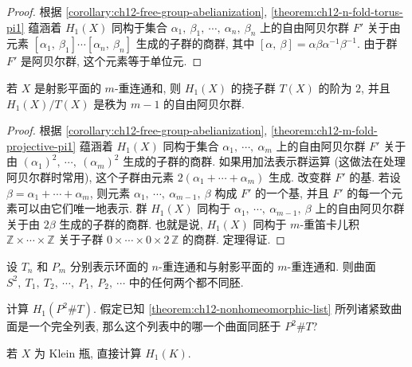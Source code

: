 \begin{proof}
根据 \cref{corollary:ch12-free-group-abelianization}, \cref{theorem:ch12-n-fold-torus-pi1} 蕴涵着 $H_{1}(X)$ 同构于集合 $\alpha_{1},\ \beta_{1},\ \cdots,\ \alpha_{n},\ \beta_{n}$ 上的自由阿贝尔群 $F'$ 关于由元素 $[\alpha_{1},\ \beta_{1}]\cdots[\alpha_{n},\ \beta_{n}]$ 生成的子群的商群, 其中 $[\alpha,\ \beta]=\alpha\beta\alpha^{-1}\beta^{-1}$. 由于群 $F'$ 是阿贝尔群, 这个元素等于单位元.
\end{proof}

\begin{theorem}
\label{theorem:ch12-projective-sum-homology}
若 $X$ 是射影平面的 $m$-重连通和, 则 $H_{1}(X)$ 的挠子群 $T(X)$ 的阶为 $2$, 并且 $H_{1}(X)/T(X)$ 是秩为 $m-1$ 的自由阿贝尔群.
\end{theorem}

\begin{proof}
根据 \cref{corollary:ch12-free-group-abelianization}, \cref{theorem:ch12-m-fold-projective-pi1} 蕴涵着 $H_{1}(X)$ 同构于集合 $\alpha_{1},\ \cdots,\ \alpha_{m}$ 上的自由阿贝尔群 $F'$ 关于由 $(\alpha_{1})^{2},\ \cdots,\ (\alpha_{m})^{2}$ 生成的子群的商群. 如果用加法表示群运算 (这做法在处理阿贝尔群时常用), 这个子群由元素 $2(\alpha_{1}+\cdots+\alpha_{m})$ 生成. 改变群 $F'$ 的基. 若设 $\beta=\alpha_{1}+\cdots+\alpha_{m}$, 则元素 $\alpha_{1},\ \cdots,\ \alpha_{m-1},\ \beta$ 构成 $F'$ 的一个基, 并且 $F'$ 的每一个元素可以由它们唯一地表示. 群 $H_{1}(X)$ 同构于 $\alpha_{1},\ \cdots,\ \alpha_{m-1},\ \beta$ 上的自由阿贝尔群关于由 $2\beta$ 生成的子群的商群. 也就是说, $H_{1}(X)$ 同构于 $m$-重笛卡儿积 $\mathbb{Z}\times\cdots\times\mathbb{Z}$ 关于子群 $0\times\cdots\times 0\times 2\,\mathbb{Z}$ 的商群. 定理得证.
\end{proof}

\begin{theorem}[紧致曲面的非同胚列表]
\label{theorem:ch12-nonhomeomorphic-list}
设 $T_{n}$ 和 $P_{m}$ 分别表示环面的 $n$-重连通和与射影平面的 $m$-重连通和. 则曲面 $S^{2},\ T_{1},\ T_{2},\ \cdots,\ P_{1},\ P_{2},\ \cdots$ 中的任何两个都不同胚.
\end{theorem}

\begin{exercise}
\label{exercise:ch12-sec75-01}
计算 $H_{1}(P^{2}\#T)$. 假定已知 \cref{theorem:ch12-nonhomeomorphic-list} 所列诸紧致曲面是一个完全列表, 那么这个列表中的哪一个曲面同胚于 $P^{2}\#T$?
\end{exercise}

\begin{exercise}
\label{exercise:ch12-sec75-02}
若 $X$ 为 Klein 瓶, 直接计算 $H_{1}(K)$.
\end{exercise}

